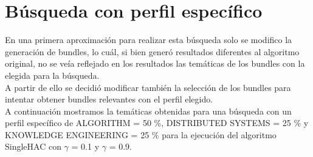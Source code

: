 \section{Búsqueda con perfil específico}
En una primera aproximación para realizar esta búsqueda solo se modifico la generación de bundles, 
lo cuál, si bien generó resultados diferentes al algoritmo original, no se veía reflejado en los 
resultados las temáticas de los bundles con la elegida para la búsqueda.\\
A partir de ello se decidió modificar también la selección de los bundles para intentar obtener 
bundles relevantes con el perfil elegido.\\
A continuación mostramos la temáticas obtenidas para una búsqueda con un perfil específico de 
ALGORITHM = 50 \%, DISTRIBUTED SYSTEMS = 25 \% y KNOWLEDGE ENGINEERING = 25 \% para la ejecución 
del algoritmo SingleHAC con $\gamma$ = 0.1 y $\gamma$ = 0.9.